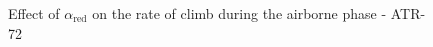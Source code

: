 \documentclass[12pt,oneside]{book}
\begin{document}
%
%
%
%
%
%
%
\begin{figure}
\centering

\caption{Effect of $\alpha_{\text{red}}$ on the rate of climb during the airborne phase - ATR-72}
\end{figure}
%
%
%
%
%
%
\end{document}
